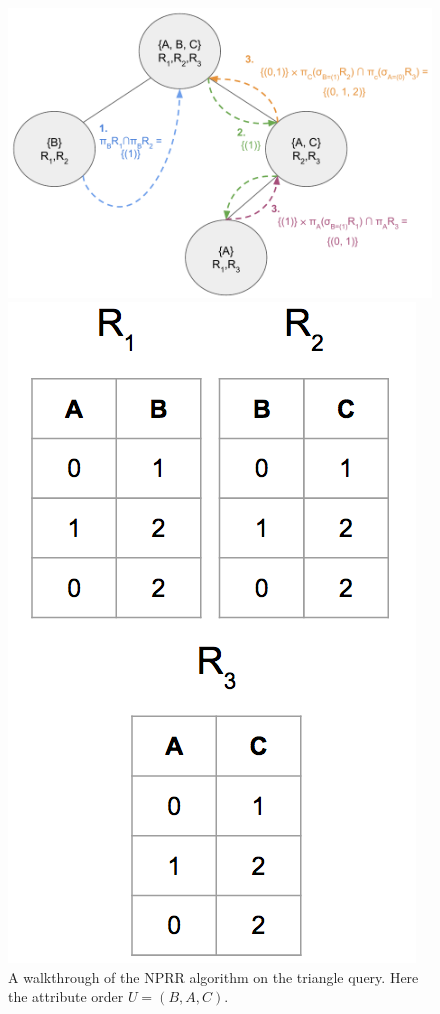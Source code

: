 \begin{figure}[h]
\label{fig:walkthrough}
  \begin{minipage}[b]{0.55\linewidth}
  \centering
  \includegraphics[scale=0.55]{walkthrough.pdf}
  \end{minipage}
  \begin{minipage}[b]{0.45\linewidth}
  \centering
  \includegraphics[scale=0.22]{table_walkthrough.png}
  \end{minipage}
\caption{A walkthrough of the NPRR algorithm on the triangle query. Here the attribute order $U = (B,A, C)$.}
\end{figure}